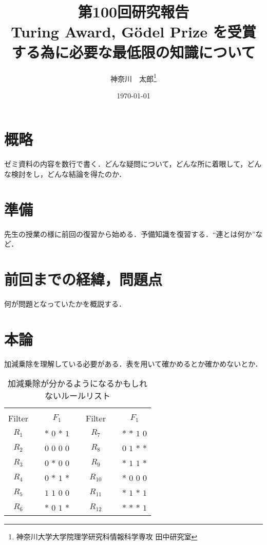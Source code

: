 \documentclass[10pt,twocolumn]{jarticle}
\title{第100回研究報告 \\ Turing Award, G\"{o}del Prize を受賞する為に必要な最低限の知識について}
\author{神奈川　太郎\if0\thanks{神奈川大学大学院理学研究科情報科学専攻 田中研究室}\fi}
\date{\today}
\begin{document}
\maketitle
\thispagestyle{empty}

%
%
%
%
%
%

% 

\section{概略}
\noindent ゼミ資料の内容を数行で書く．どんな疑問について，どんな所に着眼して，どんな検討をし，どんな結論を得たのか．

\section{準備}
\noindent 先生の授業の様に前回の復習から始める．予備知識を復習する．``連とは何か''など．

\section{前回までの経緯，問題点}
\noindent 何が問題となっていたかを概説する．

\section{本論}
加減乗除を理解している必要がある．表を用いて確かめるとか確かめないとか．

\begin{table}[htbp]
 \begin{center}
  \caption{加減乗除が分かるようになるかもしれないルールリスト}
  \begin{tabular}{ccccccc}
        & &             & &        & &             \\ \cline{1-3} \cline{5-7}
 Filter & & $F_{1}$      & & Filter & & $F_{1}$      \\ \cline{1-3} \cline{5-7}
 $R_{1}$ & & $*$ $0$ $*$ $1$ & & $R_{7}$ & & $*$ $*$ $1$ $0$ \\
 $R_{2}$ & & $0$ $0$ $0$ $0$ & & $R_{8}$ & & $0$ $1$ $*$ $*$ \\
 $R_{3}$ & & $0$ $*$ $0$ $0$ & & $R_{9}$ & & $*$ $1$ $1$ $*$ \\
 $R_{4}$ & & $0$ $*$ $1$ $*$ & & $R_{10}$ & & $*$ $0$ $0$ $0$ \\
 $R_{5}$ & & $1$ $1$ $0$ $0$ & & $R_{11}$ & & $*$ $1$ $*$ $1$ \\
 $R_{6}$ & & $*$ $0$ $1$ $*$ & & $R_{12}$ & & $*$ $*$ $*$ $1$ \\ \cline{1-3} \cline{5-7}
  \end{tabular}
  \label{rulelist}
 \end{center}
\end{table}
\end{document}
